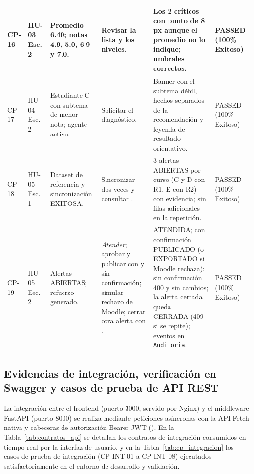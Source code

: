 \documentclass[11pt,a4paper]{article}
\begin{document}
\begin{longtable}{|R{1.35cm}|R{1.5cm}|R{2.6cm}|R{3.0cm}|R{3.0cm}|R{1.7cm}|}
\footnotesize CP-16 & \footnotesize HU-03 Esc. 2 & \footnotesize Promedio 6.40; notas 4.9, 5.0, 6.9 y 7.0. & \footnotesize Revisar la lista y los niveles. & \footnotesize Los 2 críticos con punto de 8 px aunque el promedio no lo indique; umbrales correctos. & \footnotesize PASSED (100\% Exitoso)\\ \hline
\footnotesize CP-17 & \footnotesize HU-04 Esc. 2 & \footnotesize Estudiante C con subtema de menor nota; agente activo. & \footnotesize Solicitar el diagnóstico. & \footnotesize Banner con el subtema débil, hechos separados de la recomendación y leyenda de resultado orientativo. & \footnotesize PASSED (100\% Exitoso)\\ \hline
\footnotesize CP-18 & \footnotesize HU-05 Esc. 1 & \footnotesize Dataset de referencia y sincronización EXITOSA. & \footnotesize Sincronizar dos veces y consultar . & \footnotesize 3 alertas ABIERTAS por curso (C y D con R1, E con R2) con evidencia; sin filas adicionales en la repetición. & \footnotesize PASSED (100\% Exitoso)\\ \hline
\footnotesize CP-19 & \footnotesize HU-05 Esc. 2 & \footnotesize Alertas ABIERTAS; refuerzo generado. & \footnotesize \emph{Atender}; aprobar y publicar con y sin confirmación; simular rechazo de Moodle; cerrar otra alerta con . & \footnotesize ATENDIDA; con confirmación PUBLICADO (o EXPORTADO si Moodle rechaza); sin confirmación 400 y sin cambios; la alerta cerrada queda CERRADA (409 si se repite); eventos en \texttt{Auditoria}. & \footnotesize PASSED (100\% Exitoso)\\ \hline
\end{longtable}

\subsection{Evidencias de integración, verificación en Swagger y casos de prueba de API REST}
La integración entre el frontend (puerto 3000, servido por Nginx) y el middleware FastAPI (puerto 8000) se realiza mediante peticiones asíncronas con la API Fetch nativa y cabeceras de autorización Bearer JWT (). En la Tabla~\ref{tab:contratos_api} se detallan los contratos de integración consumidos en tiempo real por la interfaz de usuario, y en la Tabla~\ref{tab:cp_integracion} los casos de prueba de integración (CP-INT-01 a CP-INT-08) ejecutados satisfactoriamente en el entorno de desarrollo y validación.
\end{document}
